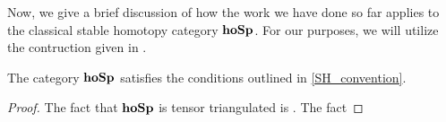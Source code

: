 \documentclass[../main.tex]{subfiles}
\begin{document}
Now, we give a brief discussion of how the work we have done so far applies to the classical stable homotopy category $\mathbf{hoSp}$. For our purposes, we will utilize the contruction given in \cite{nlab:introduction_to_stable_homotopy_theory}.

\begin{proposition}
    The category $\mathbf{hoSp}$ satisfies the conditions outlined in \autoref{SH_convention}.
\end{proposition}
\begin{proof}
    The fact that $\mathbf{hoSp}$ is tensor triangulated is \cite[Proposition 5.4]{nlab:introduction_to_stable_homotopy_theory}. The fact 
\end{proof}
\end{document}
